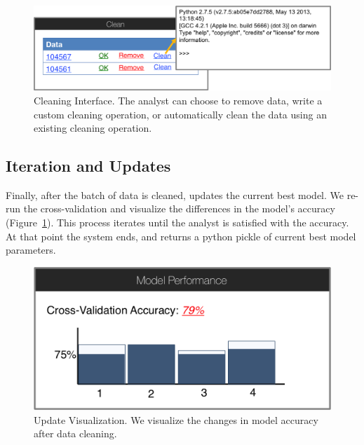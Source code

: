 \begin{figure}[t]
\centering
 \includegraphics[width=\columnwidth]{figs/interface4.png}
 \caption{Cleaning Interface. The analyst can choose to remove data, write a custom cleaning operation, or automatically clean the data using an existing cleaning operation.}
\end{figure}

\subsection{Iteration and Updates}
Finally, after the batch of data is cleaned, \sys updates the current best model.
We re-run the cross-validation and visualize the differences in the model's accuracy (Figure~\ref{modelacc}).
This process iterates until the analyst is satisfied with the accuracy.
At that point the system ends, and returns a python pickle of current best model parameters.

\begin{figure}[t]
\centering
 \includegraphics[width=0.6\columnwidth]{figs/interface5.png}
 \caption{Update Visualization. We visualize the changes in model accuracy after data cleaning.}\label{modelacc}
\end{figure}
